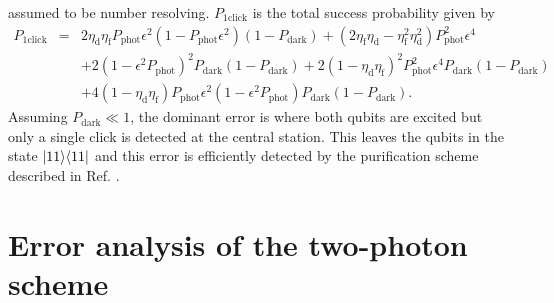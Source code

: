 assumed to be number resolving.  $P_{\text{1click}}$ is the total success
probability given by
\begin{eqnarray}
P_{\text{1click}}&=&2\eta_{\text{d}}
\eta_{\text{f}}P_{\text{phot}}\epsilon^{2}
(1-P_{\text{phot}}\epsilon^{2})(1-P_{\text{dark}})
+(2\eta_{\text{f}}\eta_{\text{d}}-
\eta_{\text{f}}^{2}\eta_{\text{d}}^{2}) P_{\text{phot}}^{2}\epsilon^{4}
\nonumber \\
&&+2(1-\epsilon^{2}P_{\text{phot}})^{2}
P_{\text{dark}}(1-P_{\text{dark}}) +2(1-\eta_{\text{d}}\eta_{\text{f}})^{2}
P_{\text{phot}}^{2}\epsilon^{4}P_{\text{dark}}(1-P_{\text{dark}})\nonumber \\
&&+4(1\!-\!\eta_{\text{d}}\eta_{\text{f}}) P_{\text{phot}}\epsilon^{2}
(1\!-\!\epsilon^{2}P_{\text{phot}}) P_{\text{dark}}(1\!-\!P_{\text{dark}}).
\end{eqnarray}
Assuming $P_{\text{dark}}\ll1$, the dominant error is where both qubits are
excited but only a single click is detected at the central station. This leaves
the qubits in the state $| 11 \rangle\langle 11 |$ and this error is efficiently
detected by the purification scheme described in Ref. \cite{bennett}.

\section{Error analysis of the two-photon scheme} \label{two}

